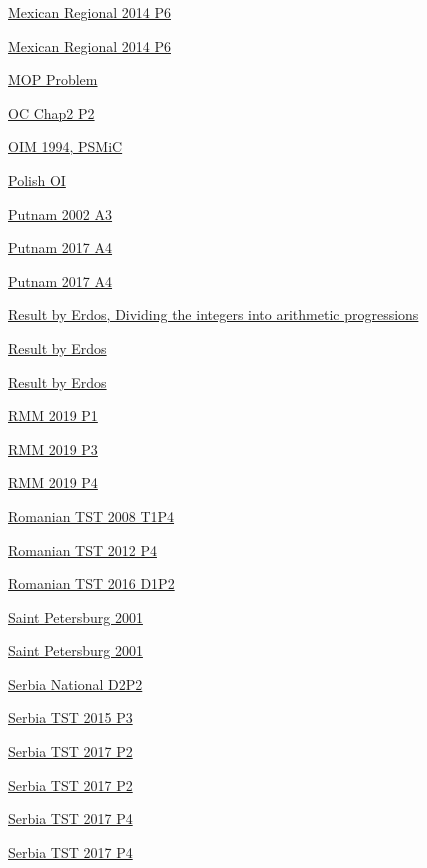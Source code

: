 \hyperref  [problem:Mexican Regional 2014 P6]{Mexican Regional 2014 P6}

\hyperref  [problem:Mexican Regional 2014 P6]{Mexican Regional 2014 P6}

\hyperref  [problem:MOP Problem]{MOP Problem}

\hyperref  [problem:OC Chap2 P2]{OC Chap2 P2}

\hyperref  [problem:OIM 1994, PSMiC]{OIM 1994, PSMiC}

\hyperref  [problem:Polish OI]{Polish OI}

\hyperref  [problem:Putnam 2002 A3]{Putnam 2002 A3}

\hyperref  [problem:Putnam 2017 A4]{Putnam 2017 A4}

\hyperref  [problem:Putnam 2017 A4]{Putnam 2017 A4}

\hyperref  [problem:Result by Erdos, Dividing the integers into arithmetic progressions]{Result by Erdos, Dividing the integers into arithmetic progressions}

\hyperref  [problem:Result by Erdos]{Result by Erdos}

\hyperref  [problem:Result by Erdos]{Result by Erdos}

\hyperref  [problem:RMM 2019 P1]{RMM 2019 P1}

\hyperref  [problem:RMM 2019 P3]{RMM 2019 P3}

\hyperref  [problem:RMM 2019 P4]{RMM 2019 P4}

\hyperref  [problem:Romanian TST 2008 T1P4]{Romanian TST 2008 T1P4}

\hyperref  [problem:Romanian TST 2012 P4]{Romanian TST 2012 P4}

\hyperref  [problem:Romanian TST 2016 D1P2]{Romanian TST 2016 D1P2}

\hyperref  [problem:Saint Petersburg 2001]{Saint Petersburg 2001}

\hyperref  [problem:Saint Petersburg 2001]{Saint Petersburg 2001}

\hyperref  [problem:Serbia National D2P2]{Serbia National D2P2}

\hyperref  [problem:Serbia TST 2015 P3]{Serbia TST 2015 P3}

\hyperref  [problem:Serbia TST 2017 P2]{Serbia TST 2017 P2}

\hyperref  [problem:Serbia TST 2017 P2]{Serbia TST 2017 P2}

\hyperref  [problem:Serbia TST 2017 P4]{Serbia TST 2017 P4}

\hyperref  [problem:Serbia TST 2017 P4]{Serbia TST 2017 P4}

